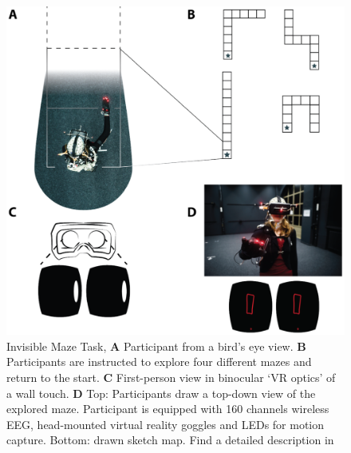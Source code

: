 \begin{figure}[!t]
\centering
    \includegraphics[width=\linewidth]{figures/IMT_Task.png}
    \caption{Invisible Maze Task, \textbf{A} Participant from a bird’s eye view. \textbf{B} Participants are instructed to explore four different mazes and return to the start. \textbf{C} First-person view in binocular `VR optics' of a wall touch. \textbf{D} Top: Participants draw a top-down view of the explored maze. Participant is equipped with 160 channels wireless EEG, head-mounted virtual reality goggles and LEDs for motion capture. Bottom: drawn sketch map. Find a detailed description in \cite{Gehrke2018}}
    \label{imt_task}
\end{figure}

